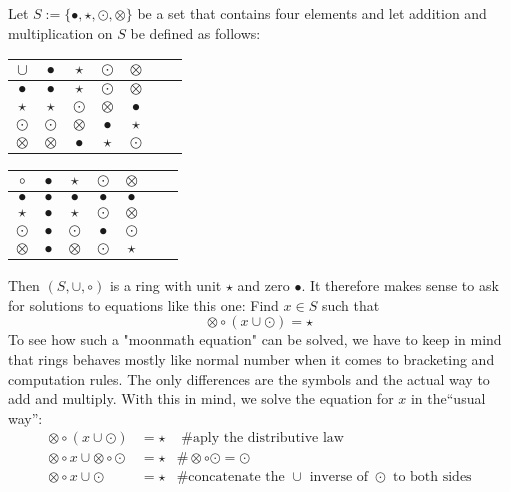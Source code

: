\begin{example} Let $S:=\{\bullet,\star,\odot,\otimes\}$ be a set that contains four elements and let addition and multiplication on $S$ be defined as follows:
\begin{center}
  \begin{tabular}{c | c c c c c c}
    $\cup$ & $\bullet$ & $\star$ & $\odot$ & $\otimes$ \\\hline
    $\bullet$ & $\bullet$ & $\star$ & $\odot$ & $\otimes$ \\
    $\star$ & $\star$ & $\odot$ & $\otimes$ & $\bullet$ \\
    $\odot$ & $\odot$ & $\otimes$ & $\bullet$ & $\star$ \\
    $\otimes$ & $\otimes$ & $\bullet$ & $\star$ & $\odot$ \\
  \end{tabular} \quad \quad \quad \quad
  \begin{tabular}{c | c c c c c c}
$ \circ $ & $\bullet$ & $\star$ & $\odot$ & $\otimes$ & \\\hline
        $\bullet$ & $\bullet$ & $\bullet$ & $\bullet$ & $\bullet$ &\\
        $\star$ & $\bullet$ & $\star$ & $\odot$ & $\otimes$ &\\
        $\odot$ & $\bullet$ & $\odot$ & $\bullet$ & $\odot$ &\\
        $\otimes$ & $\bullet$ & $\otimes$ & $\odot$ & $\star$ &\\
  \end{tabular}
\end{center}
Then $(S,\cup,\circ)$ is a ring with unit $\star$ and zero $\bullet$. It therefore makes sense to ask for solutions to equations like this one:
Find $x\in S$ such that
$$
\otimes \circ (x \cup \odot ) = \star
$$
To see how such a "moonmath equation" can be solved, we have to keep in mind that rings behaves mostly like normal number when it comes to bracketing and computation rules. The only differences are the symbols and the actual way to add and multiply. With this in mind, we solve the equation for $x$ in the``usual way'':
\begin{align*}
\otimes \circ (x \cup \odot ) &= \star & \text{ \# aply the distributive law}\\
\otimes \circ x \cup \otimes \circ \odot  &= \star &\# \otimes \circ \odot = \odot\\
\otimes \circ x \cup \odot  &= \star & \text{\# concatenate the $\cup$ inverse of $\odot$ to both sides}\\

\end{align*}
\end{example}
